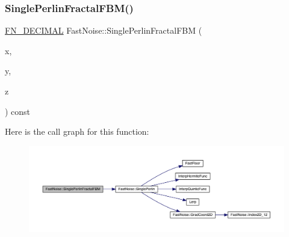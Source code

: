 \subsubsection{\texorpdfstring{Single\+Perlin\+Fractal\+F\+B\+M()}{SinglePerlinFractalFBM()}\hspace{0.1cm}{\footnotesize\ttfamily [2/2]}}
{\footnotesize\ttfamily \mbox{\hyperlink{_fast_noise_8h_a75a9ef6d2541c4921815b885bfd449c3}{F\+N\+\_\+\+D\+E\+C\+I\+M\+AL}} Fast\+Noise\+::\+Single\+Perlin\+Fractal\+F\+BM (\begin{DoxyParamCaption}\item[{\mbox{\hyperlink{_fast_noise_8h_a75a9ef6d2541c4921815b885bfd449c3}{F\+N\+\_\+\+D\+E\+C\+I\+M\+AL}}}]{x,  }\item[{\mbox{\hyperlink{_fast_noise_8h_a75a9ef6d2541c4921815b885bfd449c3}{F\+N\+\_\+\+D\+E\+C\+I\+M\+AL}}}]{y,  }\item[{\mbox{\hyperlink{_fast_noise_8h_a75a9ef6d2541c4921815b885bfd449c3}{F\+N\+\_\+\+D\+E\+C\+I\+M\+AL}}}]{z }\end{DoxyParamCaption}) const\hspace{0.3cm}{\ttfamily [private]}}

Here is the call graph for this function\+:
\nopagebreak
\begin{figure}[H]
\begin{center}
\leavevmode
\includegraphics[width=350pt]{d1/dd8/class_fast_noise_ab2189c13cfabb4e900c6e63d74962ce2_cgraph}
\end{center}
\end{figure}
\mbox{\label{class_fast_noise_a20d9ce6e0bd7730ac242e7de5fda0541}} 
